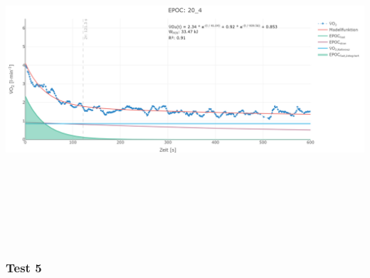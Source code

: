 \documentclass[
  letterpaper,
  DIV=11]{scrartcl}
\begin{document}
\includegraphics[width=11.45833in,height=4.6875in]{images/20_4.png}

\subsubsection{Test 5}
\end{document}
